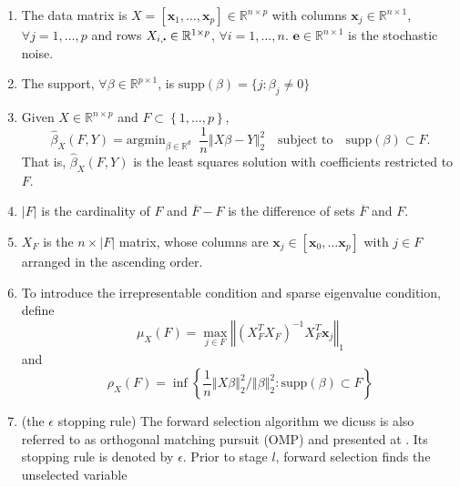 \documentclass[11pt,review,authoryear]{elsarticle}
\begin{document}
\begin{appendices}
\begin{enumerate}
  \item     The data matrix is $X = \left[ \mathbf{x}_1, \ldots,\mathbf{x}_p \right] \in \mathbb{R}^{n \times p}$ with columns $\mathbf{x}_j \in \mathbb{R}^{n \times 1}$, $\forall j=1,\ldots,p$ \; and rows $ X_{i,\bigcdot} \in \mathbb{R}^{1 \times p}$, $\forall i = 1,\ldots,n$. $\mathbf{e}\in \mathbb{R}^{n\times 1}$ is the stochastic noise.
  \item     The support, $\forall \beta \in \mathbb{R}^{p \times 1}$, is $\mathrm{supp}(\beta) = \{ j : \beta_j \neq 0 \} $
  \item     Given $X \in \mathbb{R}^{n \times p}$ and $F \subset \left\{1, \ldots, p \right\}$,
  \begin{displaymath}
    \widehat{\beta}_{X} \left( F,Y \right) =
    \mathrm{argmin}_{ \beta \in \mathbb{R}^d} \;\;
    \frac{1}{n}\left\Vert X\beta - Y\right\Vert_{2}^{2}
    \quad\mbox{subject to}\quad \mathrm{supp}(\beta)\subset F.
  \end{displaymath}
  That is, $\widehat{\beta}_{X}\left(F,Y\right)$ is the least squares solution with coefficients restricted to $F$.
  \item $\left\vert F \right\vert$ is the cardinality of $F$ and $\overline{F}-F$ is the difference of sets $\overline{F}$ and $F$.
  \item $X_F$ is the $n \times \left\vert F \right\vert$ matrix, whose columns are $\mathbf{x}_j \in \left[ \mathbf{x}_0, \ldots \mathbf{x}_p \right]$ with $j\in F$ arranged in the ascending order.
  \item To introduce the irrepresentable condition and sparse eigenvalue condition, define
  \begin{displaymath}
    \mu_{X}\left(F\right)=\max_{j\in F}\left\Vert \left(X_{F}^{T}X_{F}\right)^{-1}X_{F}^{T}\mathbf{x}_{j}\right\Vert _{1}
  \end{displaymath}
  and
  \begin{displaymath}
    \rho_{X}\left(F\right)=\inf\left\{ \frac{1}{n}\left\Vert X\beta\right\Vert _{2}^{2}/\left\Vert \beta\right\Vert _{2}^{2}:\mathrm{supp}\left(\beta\right)\subset F\right\}
  \end{displaymath}
  \item (the $\epsilon$ stopping rule) The forward selection algorithm we dicuss is also referred to as orthogonal matching pursuit (OMP) and presented at \citet[Figure~1]{zhang09}. Its stopping rule is denoted by $\epsilon$. Prior to stage $l$, forward selection finds the unselected variable

\end{enumerate}
\end{appendices}
\end{document}
